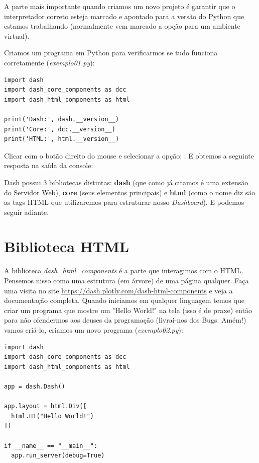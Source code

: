 \documentclass[a4paper,11pt]{article}
\begin{document}
A parte mais importante quando criamos um novo projeto é garantir que o interpretador correto esteja marcado e apontado para a versão do Python que estamos trabalhando (normalmente vem marcado a opção para um ambiente virtual).

Criamos um programa em Python para verificarmos se tudo funciona corretamente (\textit{exemplo01.py}):
\begin{lstlisting}[]
import dash
import dash_core_components as dcc
import dash_html_components as html

print('Dash:', dash.__version__)
print('Core:', dcc.__version__)
print('HTML:', html.__version__)
\end{lstlisting}

Clicar com o botão direito do mouse e selecionar a opção: . E obtemos a seguinte resposta na saída da console: \\

Dash possui 3 bibliotecas distintas: \textbf{dash} (que como já citamos é uma extensão do Servidor Web), \textbf{core} (seus elementos principais) e \textbf{html} (como o nome diz são as tags HTML que utilizaremos para estruturar nosso \textit{Dashboard}). E podemos seguir adiante.

\section{Biblioteca HTML}
A biblioteca \textit{dash\_html\_components} é a parte que interagimos com o HTML. Pensemos nisso como uma estrutura (em árvore) de uma página qualquer. Faça uma visita no site \url{https://dash.plotly.com/dash-html-components} e veja a documentação completa. Quando iniciamos em qualquer linguagem temos que criar um programa que mostre um "Hello World!" na tela (isso é de praxe) então para não ofendermos aos deuses da programação (livrai-nos dos Bugs. Amém!) vamos criá-lo, criamos um novo programa (\textit{exemplo02.py}):
\begin{lstlisting}[]
import dash
import dash_core_components as dcc
import dash_html_components as html

app = dash.Dash()

app.layout = html.Div([
  html.H1("Hello World!")
])

if __name__ == "__main__":
  app.run_server(debug=True)
\end{lstlisting}
\end{document}

